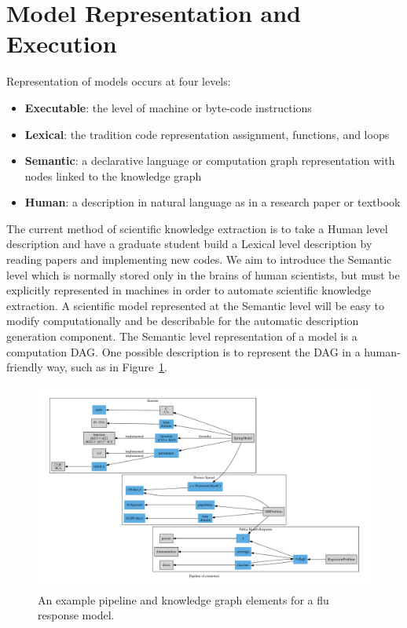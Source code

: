 \documentclass{article}
\providecommand{\tightlist}{%
  \setlength{\itemsep}{0pt}\setlength{\parskip}{0pt}}
\begin{document}
\section{Model Representation and Execution}

Representation of models occurs at four levels:
\begin{itemize}\tightlist
    \item \textbf{Executable}: the level of machine or byte-code instructions
    \item \textbf{Lexical}: the tradition code representation assignment, functions, and loops
    \item \textbf{Semantic}: a declarative language or computation graph representation with nodes linked to the knowledge graph
    \item \textbf{Human}: a description in natural language as in a research paper or textbook
\end{itemize}

The current method of scientific knowledge extraction is to take a Human level description and have a graduate student build a Lexical level description by reading papers and implementing new codes. We aim to introduce the Semantic level which is normally stored only in the brains of human scientists, but must be explicitly represented in machines in order to automate scientific knowledge extraction. A scientific model represented at the Semantic level will be easy to modify computationally and be describable for the automatic description generation component. The Semantic level representation of a model is a computation DAG. One possible description is to represent the DAG in a human-friendly way, such as in Figure~\ref{fig:flu}.
\begin{figure}[hbtp]
    \centering
    \includegraphics[width=\textwidth]{flu_pipeline.pdf}
    \caption{An example pipeline and knowledge graph elements for a flu response model.}
    \label{fig:flu}
\end{figure}
\end{document}
